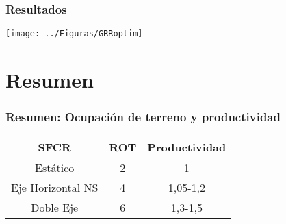 \documentclass[xcolor=dvipsnames]{beamer}
\begin{document}
\begin{frame}
  \frametitle{Resultados}
  \begin{center}
      \texttt{[image: ../Figuras/GRRoptim]}
  \end{center}
\end{frame}


\section{Resumen}


\begin{frame}
\frametitle{Resumen: Ocupación de terreno y productividad}
\begin{block}
{}

\begin{center}
\begin{tabular}{ccc}
\toprule 
SFCR & ROT & Productividad\tabularnewline
\midrule 
Estático & 2 & 1\tabularnewline
\midrule 
Eje Horizontal NS & 4 & 1,05-1,2\tabularnewline
\midrule 
Doble Eje & 6 & 1,3-1,5\tabularnewline
\bottomrule
\end{tabular}
\par\end{center}

\end{block}

\end{frame}
\end{document}

